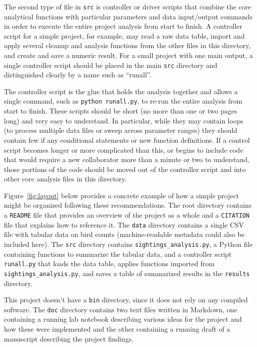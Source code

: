 \documentclass[10pt]{article}
\begin{document}
The second type of file in \texttt{src} is controller or driver
scripts that combine the core analytical functions with particular
parameters and data input/output commands in order to execute the
entire project analysis from start to finish. A controller script for
a simple project, for example, may read a raw data table, import and
apply several cleanup and analysis functions from the other files in
this directory, and create and save a numeric result. For a small
project with one main output, a single controller script should be
placed in the main \texttt{src} directory and distinguished clearly by
a name such as ``runall''.

The controller script is the glue that holds the analysis together and
allows a single command, such as \texttt{python runall.py}, to re-run
the entire analysis from start to finish. These scripts should be
short (no more than one or two pages long) and very easy to
understand.  In particular, while they may contain loops (to process
multiple data files or sweep across parameter ranges) they should
contain few if any conditional statements or new function
definitions. If a control script becomes longer or more complicated
than this, or begins to include code that would require a new
collaborator more than a minute or two to understand, those portions
of the code should be moved out of the controller script and into
other core analysis files in this directory.

Figure~\ref{fig:layout} below provides a concrete example of how a
simple project might be organized following these recommendations. The
root directory contains a \texttt{README} file that provides an
overview of the project as a whole and a \texttt{CITATION} file that
explains how to reference it. The \texttt{data} directory contains a
single CSV file with tabular data on bird counts (machine-readable
metadata could also be included here). The \texttt{src} directory
contains \texttt{sightings\_analysis.py}, a Python file containing
functions to summarize the tabular data, and a controller script
\texttt{runall.py} that loads the data table, applies functions
imported from \texttt{sightings\_analysis.py}, and saves a table of
summarized results in the \texttt{results} directory.

This project doesn't have a \texttt{bin} directory, since it does not
rely on any compiled software. The \texttt{doc} directory contains two
text files written in Markdown, one containing a running lab notebook
describing various ideas for the project and how these were
implemented and the other containing a running draft of a manuscript
describing the project findings.
\end{document}
